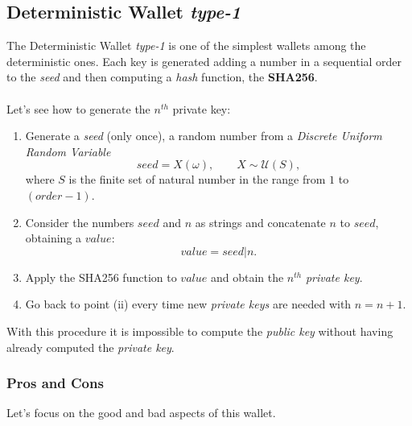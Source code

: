 \subsection{Deterministic Wallet \textit{type-1}}
The Deterministic Wallet \textit{type-1} is one of the simplest wallets among the deterministic ones. Each key is generated adding a number in a sequential order to the \textit{seed} and then computing a \textit{hash} function, the \textbf{SHA256}.
\\ \\
Let's see how to generate the $n^{th}$ private key:

\begin{enumerate}[label=(\roman*)]
	\item Generate a \textit{seed} (only once), a random number from a \textit{Discrete Uniform Random Variable}
	\begin{equation*}
	seed=X(\omega), \qquad X\sim \mathcal{U}(S),
	\end{equation*}
	where $S$ is the finite set of natural number in the range from $1$ to $(order-1)$.
	\item Consider the numbers $seed$ and $n$ as strings and concatenate $n$ to $seed$, obtaining a $value$:
	\begin{equation*}
	value=seed|n.
	\end{equation*}
	\item Apply the SHA256 function to $value$ and obtain the $n^{th}$ \textit{private key}.
	\item Go back to point (ii) every time new \textit{private keys} are needed with $n=n+1$. 
\end{enumerate}
With this procedure it is impossible to compute the \textit{public key} without having already computed the \textit{private key}.

\subsubsection{Pros and Cons}
Let's focus on the good and bad aspects of this wallet.

